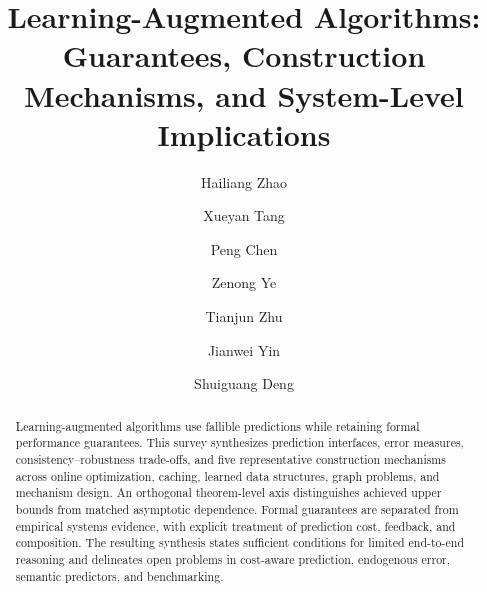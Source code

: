 \documentclass[acmsmall,screen,nonacm]{acmart}
\theoremstyle{acmdefinition}%
\begin{document}
\title{Learning-Augmented Algorithms: Guarantees, Construction Mechanisms, and System-Level Implications}

\author{Hailiang Zhao}

\author{Xueyan Tang}

\author{Peng Chen}

\author{Zenong Ye}

\author{Tianjun Zhu}

\author{Jianwei Yin}
%

\author{Shuiguang Deng}
%

\renewcommand{\shortauthors}{Zhao et al.}

\begin{abstract}
Learning-augmented algorithms use fallible predictions while retaining formal performance guarantees. This survey synthesizes prediction interfaces, error measures, consistency--robustness trade-offs, and five representative construction mechanisms across online optimization, caching, learned data structures, graph problems, and mechanism design. An orthogonal theorem-level axis distinguishes achieved upper bounds from matched asymptotic dependence. Formal guarantees are separated from empirical systems evidence, with explicit treatment of prediction cost, feedback, and composition. The resulting synthesis states sufficient conditions for limited end-to-end reasoning and delineates open problems in cost-aware prediction, endogenous error, semantic predictors, and benchmarking.
\end{abstract}
\end{document}
